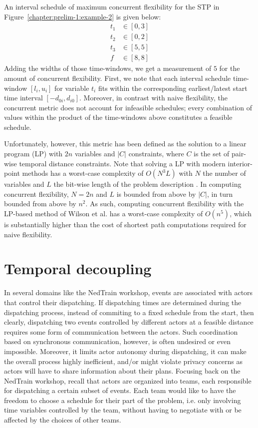 	\begin{example}
		An interval schedule of maximum concurrent flexibility for the STP in Figure~\ref{chapter:prelim-1:example-2} is given below:
		\begin{align*}
			t_1 & \in [0,3] \\
			t_2 & \in [0,2] \\
			t_3 & \in [5,5] \\ 
			f & \in [8,8]
		\end{align*}
		Adding the widths of those time-windows, we get a measurement of $5$ for the amount of concurrent flexibility.
		First, we note that each interval schedule time-window $[l_i, u_i]$ for variable $t_i$
		fits within the corresponding earliest/latest start time interval $[-d_{0i}, d_{i0}]$.
		Moreover, in contrast with naive flexibility, the concurrent metric does not account for infeasible schedules;
		every combination of values within the product of the time-windows above constitutes a feasible schedule.
	\end{example}

	Unfortunately, however, this metric has been defined as the solution to a linear program (LP) 
	with $2 n$ variables and $|C|$ constraints, where $C$ is the set of pair-wise temporal distance constraints.
	Note that solving a LP with modern interior-point methods has a worst-case complexity of $O(N^3 L)$ with 
	$N$ the number of variables and $L$ the bit-wise length of the problem description \cite{potra2000}.
	In computing concurrent flexibility, $N=2n$ and $L$ is bounded from above by $|C|$, in turn bounded from above by $n^2$.
	As such, computing concurrent flexibility with the LP-based method of Wilson et al. has a worst-case complexity of $O(n^5)$, 
	which is substantially higher than the cost of shortest path computations required for naive flexibility.

\section{Temporal decoupling}

	In several domains like the NedTrain workshop, 
	events are associated with actors that control their dispatching.
	If dispatching times are determined during the dispatching process,
	instead of commiting to a fixed schedule from the start,
	then clearly, dispatching two events controlled by different actors at a feasible distance requires some form of communication between the actors.
	Such coordination based on synchronous communication, however, is often undesired or even impossible.
	Moreover, it limits actor autonomy during dispatching,
	it can make the overall process highly inefficient,
	and/or might violate privacy concerns as actors will have to share information about their plans.
	Focusing back on the NedTrain workshop, 
	recall that actors are organized into teams, 
	each responsible for dispatching a certain subset of events.
	Each team would like to have the freedom to choose a schedule for their part of the problem,
	i.e. only involving time variables controlled by the team,
	without having to negotiate with or be affected by the choices of other teams. 

